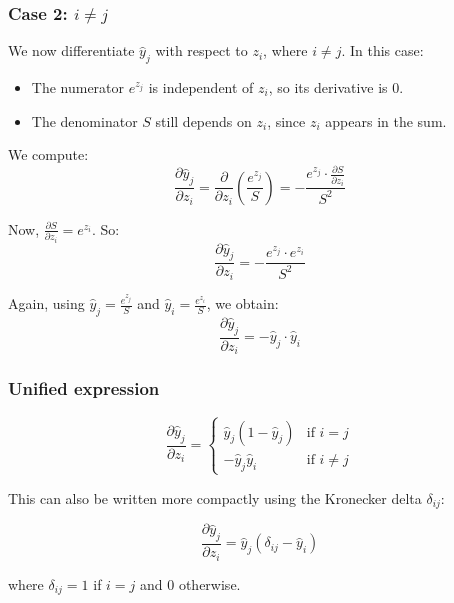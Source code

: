 \documentclass[11pt]{article}
\begin{document}

\subsubsection*{Case 2: \texorpdfstring{$i \ne j$}{i ≠ j}}

We now differentiate \( \hat{y}_j \) with respect to \( z_i \), where \( i \ne j \). In this case:

\begin{itemize}
    \item The numerator \( e^{z_j} \) is independent of \( z_i \), so its derivative is 0.
    \item The denominator \( S \) still depends on \( z_i \), since \( z_i \) appears in the sum.
\end{itemize}

We compute:
\[
\frac{\partial \hat{y}_j}{\partial z_i}
= \frac{ \partial }{ \partial z_i } \left( \frac{e^{z_j}}{S} \right)
= - \frac{ e^{z_j} \cdot \frac{ \partial S }{ \partial z_i } }{ S^2 }
\]

Now, \( \frac{\partial S}{\partial z_i} = e^{z_i} \). So:
\[
\frac{\partial \hat{y}_j}{\partial z_i} = - \frac{ e^{z_j} \cdot e^{z_i} }{ S^2 }
\]

Again, using \( \hat{y}_j = \frac{e^{z_j}}{S} \) and \( \hat{y}_i = \frac{e^{z_i}}{S} \), we obtain:
\[
\frac{\partial \hat{y}_j}{\partial z_i} = - \hat{y}_j \cdot \hat{y}_i
\]


\subsubsection*{Unified expression}

\[
\frac{\partial \hat{y}_j}{\partial z_i} = 
\begin{cases}
\hat{y}_j (1 - \hat{y}_j) & \text{if } i = j \\
-\hat{y}_j \hat{y}_i & \text{if } i \ne j
\end{cases}
\]

This can also be written more compactly using the Kronecker delta $\delta_{ij}$:

\[
\boxed{
\frac{\partial \hat{y}_j}{\partial z_i} = \hat{y}_j (\delta_{ij} - \hat{y}_i)
}
\]

where $\delta_{ij} = 1$ if $i = j$ and $0$ otherwise.
\end{document}
